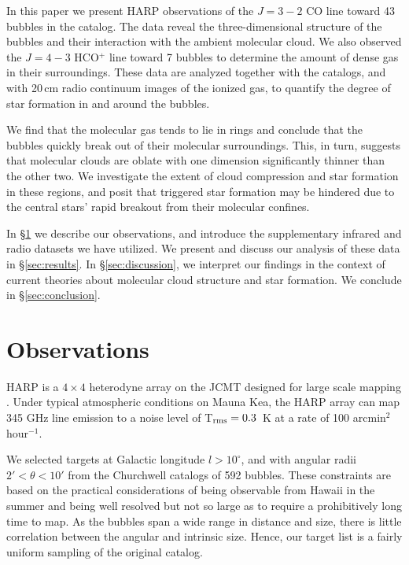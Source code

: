 In this paper we present HARP observations of the $J=3-2$ CO line
toward 43 bubbles in the  catalog.
The data reveal the three-dimensional structure of the bubbles
and their interaction with the ambient molecular cloud.
We also observed the $J=4-3$ HCO$^+$ line toward 7 bubbles
to determine the amount of dense gas in their surroundings.
These data are analyzed together with the \glimpse catalogs,
and with 20\,cm radio continuum images of the ionized gas,
to quantify the degree of star formation in and around the bubbles.


We find that the molecular gas tends to lie in rings and conclude
that the bubbles quickly break out of their molecular surroundings.
This, in turn, suggests that molecular clouds are oblate with
one dimension significantly thinner than the other two.
We investigate the extent of cloud compression and star formation in these regions,
and posit that triggered star formation may be hindered due
to the central stars' rapid breakout from their molecular confines.

In \S\ref{sec:observations} we describe our observations, and introduce the supplementary infrared and radio datasets
we have utilized. We present and discuss our analysis of these data in \S\ref{sec:results}. In \S\ref{sec:discussion},
we interpret our findings in the context of current theories about molecular cloud structure and star formation. We conclude in
\S\ref{sec:conclusion}.

\section{Observations}
\label{sec:observations}

HARP is a $4\times 4$ heterodyne array on the JCMT
designed for large scale mapping \citep{Smith08}. Under typical
atmospheric conditions on Mauna Kea, the HARP array can map 345 GHz line emission
to a noise level of T$_{\rm rms} = 0.3$\, K at a rate of
100 arcmin$^{2}$ hour$^{-1}$.

We selected targets at Galactic longitude $l>10^\circ$,
and with angular radii $2' < \theta < 10'$ from the Churchwell
catalogs of 592 bubbles. These constraints are based on the
practical considerations of being observable from Hawaii in the
summer and being well resolved but not so large as to require a
prohibitively long time to map.
As the bubbles span a wide range in distance and size,
there is little correlation between the angular and intrinsic size.
Hence, our target list is a fairly uniform sampling of the original catalog.

